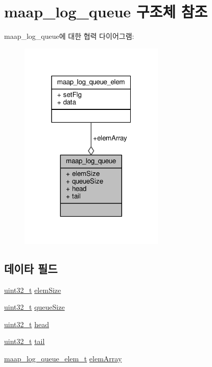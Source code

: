 \hypertarget{structmaap__log__queue}{}\section{maap\+\_\+log\+\_\+queue 구조체 참조}
\label{structmaap__log__queue}


maap\+\_\+log\+\_\+queue에 대한 협력 다이어그램\+:
\nopagebreak
\begin{figure}[H]
\begin{center}
\leavevmode
\includegraphics[width=196pt]{structmaap__log__queue__coll__graph}
\end{center}
\end{figure}
\subsection*{데이타 필드}
\begin{DoxyCompactItemize}
\item 
\hyperlink{parse_8c_a6eb1e68cc391dd753bc8ce896dbb8315}{uint32\+\_\+t} \hyperlink{structmaap__log__queue_adcb87f2809f48c3f44fc756c261ecde1}{elem\+Size}
\item 
\hyperlink{parse_8c_a6eb1e68cc391dd753bc8ce896dbb8315}{uint32\+\_\+t} \hyperlink{structmaap__log__queue_acdc388d91657198c5b07921a3d849f23}{queue\+Size}
\item 
\hyperlink{parse_8c_a6eb1e68cc391dd753bc8ce896dbb8315}{uint32\+\_\+t} \hyperlink{structmaap__log__queue_ac8143ecb1dda85e708e5252e0106dd13}{head}
\item 
\hyperlink{parse_8c_a6eb1e68cc391dd753bc8ce896dbb8315}{uint32\+\_\+t} \hyperlink{structmaap__log__queue_a3da51da0aebd2ac8b1ab802259126311}{tail}
\item 
\hyperlink{maap__log__queue_8h_a1ff79321635cbced326e55e633250d5a}{maap\+\_\+log\+\_\+queue\+\_\+elem\+\_\+t} \hyperlink{structmaap__log__queue_ac9d95354b061e13b286c4d7fb72fb6d7}{elem\+Array}
\end{DoxyCompactItemize}


